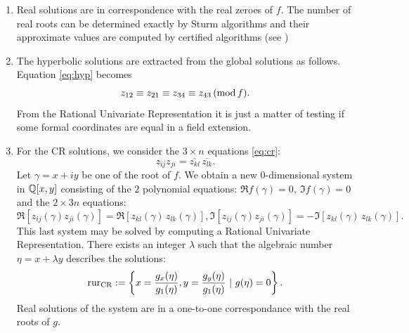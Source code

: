 \begin{enumerate}
\item Real solutions are in correspondence with the real zeroes of $f$.   The number of real roots can be determined exactly
by Sturm algorithms and their approximate values are computed by certified algorithms (see )

\item The hyperbolic solutions are extracted from the global solutions as follows.
Equation \ref{eq:hyp} becomes
$${z_{12}} \equiv {z_{21}} \equiv {z_{34}} \equiv {z_{43}} {\, (\mathrm{mod}\, f)}.$$
From the Rational Univariate Representation it is just a matter of testing if
some formal coordinates are equal in a field extension.

\item For the CR solutions, we consider the $3\times n$ equations \ref{eq:cr}:
$$z_{ij} z_{ji} = \overline{z_{kl}}\, \overline{z_{lk}}.$$
Let $\gamma = x + iy$ be one of the root of $f$.
We obtain a new 0-dimensional system in $\mathbb{Q}[x,y]$ consisting of the $2$ polynomial equations:
$\Re f(\gamma)=0, \ \Im f(\gamma)=  0$
and the $2 \times 3n$ equations:
$$\Re  \left [{z_{ij}(\gamma)}{z_{ji}(\gamma)} \right ] =\Re \left [{{z_{kl}(\gamma)}} \, {{z_{lk}(\gamma)}}\right ],
\Im  \left [{z_{ij}(\gamma)}{z_{ji}(\gamma)} \right ] = - \Im \left [{{z_{kl}(\gamma)}} \, {{z_{lk}(\gamma)}}\right ].$$
This last system may be solved by computing a Rational Univariate Representation.
There exists an integer $\lambda$ such that
the algebraic number $\eta = x+ \lambda y$ describes the solutions:
$$\mathrm{rur}_{\mathrm{CR}}:=\left \{x=\Frac{g_{x}(\eta)}{g_{1}(\eta)},y=\Frac{g_{y}(\eta)}{g_{1}(\eta)}\ | \ g(\eta)=0 \right \}.$$
Real solutions of the system are in a one-to-one correspondance with the real roots of $g$.
\end{enumerate}
